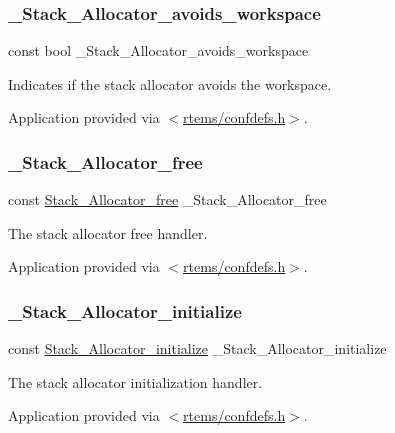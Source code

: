 \subsubsection{\texorpdfstring{\_Stack\_Allocator\_avoids\_workspace}{\_Stack\_Allocator\_avoids\_workspace}}
{\footnotesize\ttfamily const bool \+\_\+\+Stack\+\_\+\+Allocator\+\_\+avoids\+\_\+workspace}



Indicates if the stack allocator avoids the workspace. 

Application provided via $<$\mbox{\hyperlink{confdefs_8h}{rtems/confdefs.\+h}}$>$. \mbox{\label{group__RTEMSScoreStack_gac6757ab9b463b2ac5c47a7e43e6da309}} 
\subsubsection{\texorpdfstring{\_Stack\_Allocator\_free}{\_Stack\_Allocator\_free}}
{\footnotesize\ttfamily const \mbox{\hyperlink{group__RTEMSScoreStack_ga2bc90d7062b3eba257c6e2e3836deb8b}{Stack\+\_\+\+Allocator\+\_\+free}} \+\_\+\+Stack\+\_\+\+Allocator\+\_\+free}



The stack allocator free handler. 

Application provided via $<$\mbox{\hyperlink{confdefs_8h}{rtems/confdefs.\+h}}$>$. \mbox{\label{group__RTEMSScoreStack_gac8c437cd523908b2f03d1015af97dce0}} 
\subsubsection{\texorpdfstring{\_Stack\_Allocator\_initialize}{\_Stack\_Allocator\_initialize}}
{\footnotesize\ttfamily const \mbox{\hyperlink{group__RTEMSScoreStack_ga0b4e6be94e46e4f0a9e862e1f818d28b}{Stack\+\_\+\+Allocator\+\_\+initialize}} \+\_\+\+Stack\+\_\+\+Allocator\+\_\+initialize}



The stack allocator initialization handler. 

Application provided via $<$\mbox{\hyperlink{confdefs_8h}{rtems/confdefs.\+h}}$>$. \mbox{\label{group__RTEMSScoreStack_ga8c5d8c7c95443b50e9503b2d91db5ae9}} 
